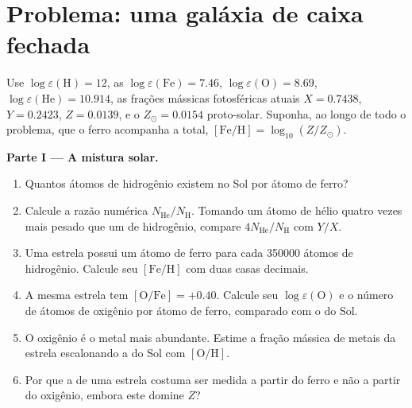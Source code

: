 \section{Problema: uma galáxia de caixa fechada}

\begin{problem}
\label{pb:b3:origin-of-elements:1}
Use $\log\varepsilon(\mathrm{H}) = 12$, as 
$\log\varepsilon(\mathrm{Fe}) = 7.46$, $\log\varepsilon(\mathrm{O}) =
8.69$, $\log\varepsilon(\mathrm{He}) = 10.914$, as frações
mássicas fotosféricas atuais $X = 0.7438$, $Y = 0.2423$, $Z = 0.0139$,
e o $Z_\odot = 0.0154$ proto-solar. Suponha, ao longo de todo o problema, que o ferro
acompanha a  total, $[\mathrm{Fe/H}] = \log_{10}(Z/Z_\odot)$.

\medskip\noindent\textbf{Parte I --- A mistura solar.}
\begin{enumerate}
\item Quantos átomos de hidrogênio existem no Sol por átomo de ferro?
\item Calcule a razão numérica $N_\mathrm{He}/N_\mathrm{H}$. Tomando
  um átomo de hélio quatro vezes mais pesado que um de hidrogênio, compare
  $4N_\mathrm{He}/N_\mathrm{H}$ com $Y/X$.
\item Uma estrela possui um átomo de ferro para cada \num{350000} átomos de hidrogênio.
  Calcule seu $[\mathrm{Fe/H}]$ com duas casas decimais.
\item A mesma estrela tem $[\mathrm{O/Fe}] = +0.40$. Calcule seu
  $\log\varepsilon(\mathrm{O})$ e o número de átomos de oxigênio por átomo de ferro,
  comparado com o do Sol.
\item O oxigênio é o metal mais abundante. Estime a fração mássica de metais da
  estrela escalonando a do Sol com $[\mathrm{O/H}]$.
\item Por que a  de uma estrela costuma ser medida a partir do ferro
  e não a partir do oxigênio, embora este domine $Z$?
\end{enumerate}


\end{problem}
